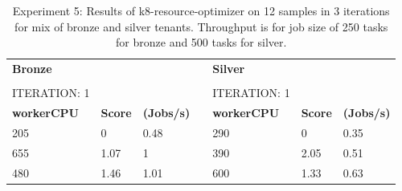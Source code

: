 \begin{table}[H]
\caption{Experiment 5: Results of k8-resource-optimizer on 12 samples in 3 iterations for mix of bronze and silver tenants. Throughput is for job size of 250  tasks for bronze and 500 tasks for silver.}
\label{tbl:results-5}
\centering
\begin{tabular}{lllllll}
\textbf{Bronze}                          & \textbf{}                           & \textbf{}                             & \textbf{}                      & \textbf{Silver}                         & \textbf{}                           & \textbf{}                             \\
                                         &                                     &                                       &                                &                                         &                                     &                                       \\
ITERATION: 1                             &                                     &                                       &                                & ITERATION: 1                            &                                     &                                       \\ \cline{1-3} \cline{5-7} 
\multicolumn{1}{|l|}{\textbf{workerCPU}} & \multicolumn{1}{l|}{\textbf{Score}} & \multicolumn{1}{l|}{\textbf{(Jobs/s)}} & \multicolumn{1}{l|}{\textbf{}} & \multicolumn{1}{l|}{\textbf{workerCPU}} & \multicolumn{1}{l|}{\textbf{Score}} & \multicolumn{1}{l|}{\textbf{(Jobs/s)}} \\ \cline{1-3} \cline{5-7} 
\multicolumn{1}{|l|}{205}                & \multicolumn{1}{l|}{0}              & \multicolumn{1}{l|}{0.48}             & \multicolumn{1}{l|}{}          & \multicolumn{1}{l|}{290}                & \multicolumn{1}{l|}{0}              & \multicolumn{1}{l|}{0.35}             \\ \cline{1-3} \cline{5-7} 
\multicolumn{1}{|l|}{655}                & \multicolumn{1}{l|}{1.07}           & \multicolumn{1}{l|}{1}                & \multicolumn{1}{l|}{}          & \multicolumn{1}{l|}{390}                & \multicolumn{1}{l|}{2.05}           & \multicolumn{1}{l|}{0.51}             \\ \cline{1-3} \cline{5-7} 
\multicolumn{1}{|l|}{480}                & \multicolumn{1}{l|}{1.46}           & \multicolumn{1}{l|}{1.01}             & \multicolumn{1}{l|}{}          & \multicolumn{1}{l|}{600}                & \multicolumn{1}{l|}{1.33}           & \multicolumn{1}{l|}{0.63}             \\ \cline{1-3} \cline{5-7} 

\end{tabular}
\end{table}
